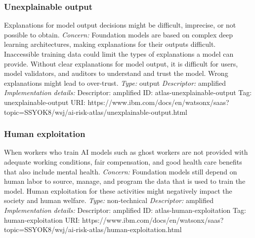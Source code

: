 \documentclass{article}
\begin{document}
\subsubsection*{Unexplainable output}
Explanations for model output decisions might be difficult, imprecise, or not possible to obtain.\newline
\textit{Concern: }Foundation models are based on complex deep learning architectures, making explanations for their outputs difficult. Inaccessible training data could limit the types of explanations a model can provide. Without clear explanations for model output, it is difficult for users, model validators, and auditors to understand and trust the model. Wrong explanations might lead to over-trust.\newline\newline
\textit{Type: }output\newline
\textit{Descriptor: }amplified \newline\newline
\textit{Implementation details:} \newline
Descriptor: amplified \newline
ID: atlas-unexplainable-output \newline
Tag: unexplainable-output \newline
URI:  https://www.ibm.com/docs/en/watsonx/saas?topic=SSYOK8/wsj/ai-risk-atlas/unexplainable-output.html\newline
\subsubsection*{Human exploitation}
When workers who train AI models such as ghost workers are not provided with adequate working conditions, fair compensation, and good health care benefits that also include mental health.\newline
\textit{Concern: }Foundation models still depend on human labor to source, manage, and program the data that is used to train the model. Human exploitation for these activities might negatively impact the society and human welfare. \newline\newline
\textit{Type: }non-technical\newline
\textit{Descriptor: }amplified \newline\newline
\textit{Implementation details:} \newline
Descriptor: amplified \newline
ID: atlas-human-exploitation \newline
Tag: human-exploitation \newline
URI:  https://www.ibm.com/docs/en/watsonx/saas?topic=SSYOK8/wsj/ai-risk-atlas/human-exploitation.html\newline
\end{document}
